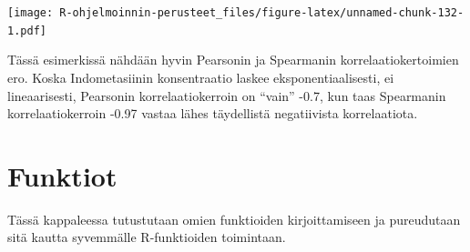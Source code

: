 \documentclass[
]{book}
\newenvironment{Shaded}{\begin{snugshade}}{\end{snugshade}}
\newcommand{\AttributeTok}[1]{\textcolor[rgb]{0.77,0.63,0.00}{#1}}
\newcommand{\CommentTok}[1]{\textcolor[rgb]{0.56,0.35,0.01}{\textit{#1}}}
\newcommand{\DecValTok}[1]{\textcolor[rgb]{0.00,0.00,0.81}{#1}}
\newcommand{\FunctionTok}[1]{\textcolor[rgb]{0.00,0.00,0.00}{#1}}
\newcommand{\NormalTok}[1]{#1}
\newcommand{\OtherTok}[1]{\textcolor[rgb]{0.56,0.35,0.01}{#1}}
\newcommand{\SpecialCharTok}[1]{\textcolor[rgb]{0.00,0.00,0.00}{#1}}
\newcommand{\StringTok}[1]{\textcolor[rgb]{0.31,0.60,0.02}{#1}}
\begin{document}
\begin{Shaded}
\end{Shaded}

\texttt{[image: R-ohjelmoinnin-perusteet\_files/figure-latex/unnamed-chunk-132-1.pdf]}

Tässä esimerkissä nähdään hyvin Pearsonin ja Spearmanin korrelaatiokertoimien ero. Koska Indometasiinin konsentraatio laskee eksponentiaalisesti, ei lineaarisesti, Pearsonin korrelaatiokerroin on ``vain'' -0.7, kun taas Spearmanin korrelaatiokerroin -0.97 vastaa lähes täydellistä negatiivista korrelaatiota.

\hypertarget{functions}{%
\chapter{Funktiot}\label{functions}}

Tässä kappaleessa tutustutaan omien funktioiden kirjoittamiseen ja pureudutaan sitä kautta syvemmälle R-funktioiden toimintaan.
\end{document}
